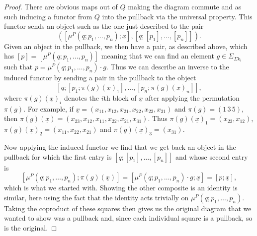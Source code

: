 \documentclass{amsbook} %
\numberwithin{section}{chapter}
\begin{document}
\begin{proof}
There are obvious maps out of $Q$ making the diagram commute and as such inducing a functor from $Q$ into the pullback via the universal property. This functor sends an object such as the one just described to the pair
    \[
        \left([\mu^P(q;p_1,\ldots,p_n);\underline{x}], [q;[p_1],\ldots,[p_n]]\right).
    \]
Given an object in the pullback, we then have a pair, as described above, which has $[p] = [\mu^P(q;p_1,\ldots,p_n)]$ meaning that we can find an element $g \in \Sigma_{\Sigma k_i}$ such that $p  = \mu^P(q;p_1,\ldots,p_n) \cdot g$. Thus we can describe an inverse to the induced functor by sending a pair in the pullback to the object
    \[
        [q;[p_1;\pi(g)(\underline{x})_1],\ldots,[p_n;\pi(g)(\underline{x})_n]],
    \]
where $\pi(g)(\underline{x})_i$ denotes the $i$th block of $\underline{x}$ after applying the permutation $\pi(g)$. For example, if $\underline{x} = (x_{11}, x_{12}, x_{21}, x_{22}, x_{23}, x_{31})$ and $\pi(g) = (1\, 3\, 5)$, then $\pi(g)(\underline{x}) = (x_{23}, x_{12}, x_{11}, x_{22}, x_{21}, x_{31})$. Thus $\pi(g)(\underline{x})_1 = (x_{23}, x_{12})$, $\pi(g)(\underline{x})_2 = (x_{11}, x_{22}, x_{21})$ and $\pi(g)(\underline{x})_3 = (x_{31})$.

Now applying the induced functor we find that we get back an object in the pullback for which the first entry is $[q;[p_1],\ldots,[p_n]]$ and whose second entry is
    \[
       [\mu^P(q;p_1,\ldots,p_n);\pi(g)(\underline{x})] = [\mu^P(q;p_1,\ldots,p_n) \cdot g;\underline{x}] = [p;\underline{x}],
    \]
which is what we started with. Showing the other composite is an identity is similar, here using the fact that the identity acts trivially on $\mu^P(q;p_1,\ldots,p_n)$. Taking the coproduct of these squares then gives us the original diagram that we wanted to show was a pullback and, since each individual square is a pullback, so is the original.
\end{proof}
\end{document}
